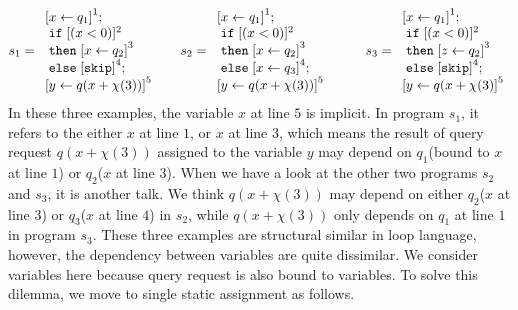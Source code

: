 \[
 s_1 = \begin{array}{l}
      \clabel{ \assign{x}{q_1}}^{1} ; \\
      \eif  [(x < 0 )]^{2} \\
      \ethen \clabel{\assign{x}{q_2}}^{3}\\
      \eelse \clabel{\eskip}^{4} ; \\
      \clabel{\assign{y}{q(x+\chi(3))}}^{5}
 \end{array}
 ~~~~~
  s_2 = \begin{array}{l}
      \clabel{ \assign{x}{q_1}}^{1} ; \\
      \eif  [(x < 0 )]^{2} \\
      \ethen \clabel{\assign{x}{q_2}}^{3}\\
      \eelse \clabel{\assign{x}{q_3}}^{4} ; \\
      \clabel{\assign{y}{q(x+\chi(3))}}^{5}
 \end{array}
 ~~~~~~~~
  s_3 = \begin{array}{l}
      \clabel{ \assign{x}{q_1}}^{1} ; \\
      \eif  [(x < 0 )]^{2} \\
      \ethen \clabel{\assign{z}{q_2}}^{3}\\
      \eelse \clabel{\eskip}^{4} ; \\
      \clabel{\assign{y}{q(x+\chi(3)}}^{5}
 \end{array}
\]
In these three examples, the variable $x$ at line $5$ is implicit. In program $s_1$, it refers to the either $x$ at line $1$, or $x$ at line $3$, which means the result of query request $q(x+\chi(3))$ assigned to the variable $y$ may depend on $q_1$(bound to $x$ at line $1$) or $q_2$($x$ at line $3$). When we have a look at the other two programs $s_2$ and $s_3$, it is another talk. We think $q(x+\chi(3))$ may depend on either $q_2$($x$ at line $3$) or $q_3$($x$ at line $4$) in $s_2$,     while $q(x+\chi(3))$ only depends on $q_1$ at line $1$ in program $s_3$. These three examples are structural similar in loop language, however, the dependency between variables are quite dissimilar. We consider variables here because query request is also bound to variables. To solve this dilemma, we move to single static assignment as follows.   
